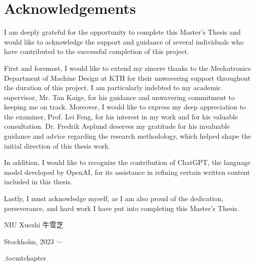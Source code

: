 \newpage
\chapter*{Acknowledgements}
I am deeply grateful for the opportunity to complete this Master's Thesis and would like to acknowledge the support and guidance of several individuals who have contributed to the successful completion of this project.

First and foremost, I would like to extend my sincere thanks to the Mechatronics Department of Machine Design at KTH for their unwavering support throughout the duration of this project. I am particularly indebted to my academic supervisor, Mr. Tan Kaige, for his guidance and unwavering commitment to keeping me on track. Moreover, I would like to express my deep appreciation to the examiner, Prof. Lei Feng, for his interest in my work and for his valuable consultation. Dr. Fredrik Asplund deserves my gratitude for his invaluable guidance and advice regarding the research methodology, which helped shape the initial direction of this thesis work.

In addition, I would like to recognize the contribution of ChatGPT, the language model developed by OpenAI, for its assistance in refining certain written content included in this thesis.

Lastly, I must acknowledge myself, as I am also proud of the dedication, perseverance, and hard work I have put into completing this Master's Thesis.

\vspace{2cm}
\hfill NIU Xuezhi 牛雪芝

\hfill Stockholm, \monthname{ }2023 $\ddot\smile$

\newpage



\newpage

\etocdepthtag.toc{mtchapter}

\tableofcontents
\newpage